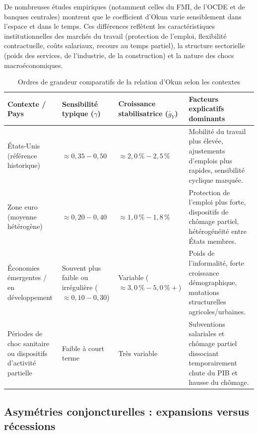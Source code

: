 \documentclass[11pt,a4paper]{article}
\begin{document}
De nombreuses études empiriques (notamment celles du FMI, de l'OCDE et de banques centrales) montrent que le coefficient d'Okun varie sensiblement dans l'espace et dans le temps. Ces différences reflètent les caractéristiques institutionnelles des marchés du travail (protection de l'emploi, flexibilité contractuelle, coûts salariaux, recours au temps partiel), la structure sectorielle (poids des services, de l'industrie, de la construction) et la nature des chocs macroéconomiques.

\begin{table}[htbp]
\centering
\caption{Ordres de grandeur comparatifs de la relation d'Okun selon les contextes}
\label{tab:okun_comparatif}
\begin{tabular}{L{3.4cm} C{2.6cm} C{3.4cm} L{4.5cm}}
\toprule
\textbf{Contexte / Pays} & \textbf{Sensibilité typique ($\gamma$)} & \textbf{Croissance stabilisatrice ($\bar{g}_Y$)} & \textbf{Facteurs explicatifs dominants} \\
\midrule
États-Unis (référence historique) & $\approx 0{,}35 - 0{,}50$ & $\approx 2{,}0\,\% - 2{,}5\,\%$ & Mobilité du travail plus élevée, ajustements d'emplois plus rapides, sensibilité cyclique marquée. \\[0.2cm]
Zone euro (moyenne hétérogène) & $\approx 0{,}20 - 0{,}40$ & $\approx 1{,}0\,\% - 1{,}8\,\%$ & Protection de l'emploi plus forte, dispositifs de chômage partiel, hétérogénéité entre États membres. \\[0.2cm]
Économies émergentes / en développement & Souvent plus faible ou irrégulière ($\approx 0{,}10 - 0{,}30$) & Variable ($\approx 3{,}0\,\% - 5{,}0\,\%+$) & Poids de l'informalité, forte croissance démographique, mutations structurelles agricoles/urbaines. \\[0.2cm]
Périodes de choc sanitaire ou dispositifs d'activité partielle & Faible à court terme & Très variable & Subventions salariales et chômage partiel dissociant temporairement chute du PIB et hausse du chômage. \\
\bottomrule
\end{tabular}
\end{table}

\subsection{Asymétries conjoncturelles : expansions versus récessions}
\end{document}

